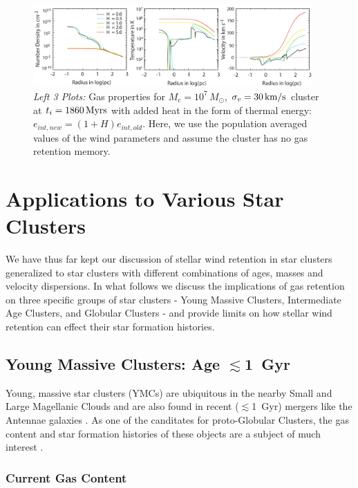 \documentclass[fleqn,usenatbib]{mnras}
\begin{document}
\begin{figure}
\centering\includegraphics[width=0.95\textwidth]{heatingPlotOut.pdf}
\caption{{\textit{Left 3 Plots:}} Gas properties for $M_c = 10^7 \, M_\odot$, $\sigma_v = 30 \, {\rm km/s}$ cluster 
at $t_{i} = 1860 \, {\rm Myrs}$ with added heat in the form of thermal energy: 
$e_{int,new} = (1 + H)e_{int,old}$.   Here, we use the population averaged values of the wind parameters and assume the cluster has no gas retention memory.}
\label{fig:heating}
\end{figure} 




\section{Applications to Various Star Clusters} \label{section:applications}

We have thus far kept our discussion of stellar wind retention in star clusters generalized to star clusters with different combinations of ages, masses and velocity dispersions.  In what follows we discuss the implications of gas retention on three specific groups of star clusters - Young Massive Clusters, Intermediate Age Clusters, and Globular Clusters - and provide limits on how stellar wind retention can effect their star formation histories.


\subsection{Young Massive Clusters: Age $\lesssim$1~Gyr}

Young, massive star clusters (YMCs) are ubiquitous in the nearby Small and Large Magellanic Clouds \citep{goud2014} and are also found in recent ($\lesssim$1~Gyr) mergers like the Antennae galaxies \citep{whitmore2007}.  As one of the canditates for proto-Globular Clusters, the gas content and star formation histories of these objects are a subject of much interest \citep[e.g.][]{zwart2010}.

\subsubsection{Current Gas Content} \label{section:YMCcurrent}
\end{document}

